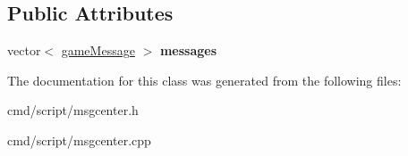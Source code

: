 \subsection*{Public Attributes}
\begin{DoxyCompactItemize}
\item 
vector$<$ \hyperlink{classgameMessage}{game\+Message} $>$ {\bfseries messages}\hypertarget{classMessageCenter_a34707921bd97c3634dbf33de771ac111}{}\label{classMessageCenter_a34707921bd97c3634dbf33de771ac111}

\end{DoxyCompactItemize}


The documentation for this class was generated from the following files\+:\begin{DoxyCompactItemize}
\item 
cmd/script/msgcenter.\+h\item 
cmd/script/msgcenter.\+cpp\end{DoxyCompactItemize}
